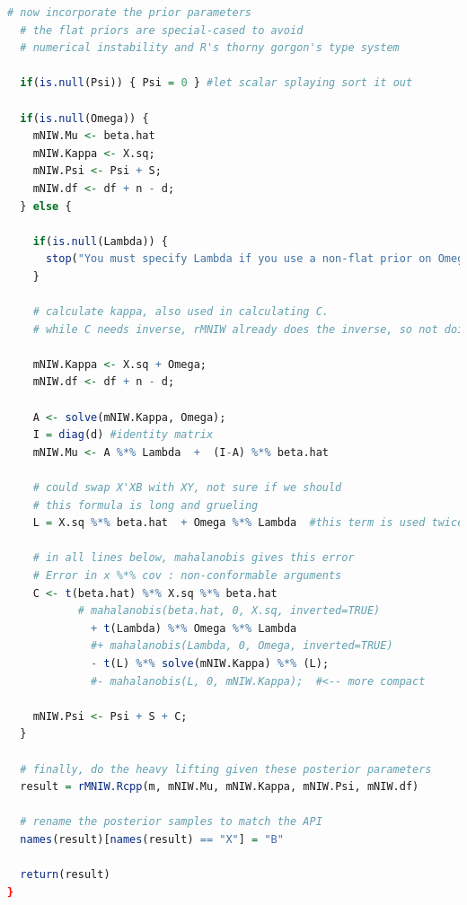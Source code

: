 \documentclass[english]{report}
\begin{document}
\begin{lstlisting}[frame=single, language=R]
  # now incorporate the prior parameters
  # the flat priors are special-cased to avoid
  # numerical instability and R's thorny gorgon's type system
  
  if(is.null(Psi)) { Psi = 0 } #let scalar splaying sort it out
  
  if(is.null(Omega)) {
    mNIW.Mu <- beta.hat
    mNIW.Kappa <- X.sq;
    mNIW.Psi <- Psi + S;
    mNIW.df <- df + n - d;
  } else {
    
    if(is.null(Lambda)) {
      stop("You must specify Lambda if you use a non-flat prior on Omega");
    }
    
    # calculate kappa, also used in calculating C.
    # while C needs inverse, rMNIW already does the inverse, so not doing it here
    
    mNIW.Kappa <- X.sq + Omega;
    mNIW.df <- df + n - d;
    
    A <- solve(mNIW.Kappa, Omega);    
    I = diag(d) #identity matrix
    mNIW.Mu <- A %*% Lambda  +  (I-A) %*% beta.hat
    
    # could swap X'XB with XY, not sure if we should
    # this formula is long and grueling
    L = X.sq %*% beta.hat  + Omega %*% Lambda  #this term is used twice
    
    # in all lines below, mahalanobis gives this error 
    # Error in x %*% cov : non-conformable arguments
    C <- t(beta.hat) %*% X.sq %*% beta.hat
           # mahalanobis(beta.hat, 0, X.sq, inverted=TRUE)
             + t(Lambda) %*% Omega %*% Lambda
             #+ mahalanobis(Lambda, 0, Omega, inverted=TRUE) 
             - t(L) %*% solve(mNIW.Kappa) %*% (L);
             #- mahalanobis(L, 0, mNIW.Kappa);  #<-- more compact
             
    mNIW.Psi <- Psi + S + C;
  }
  
  # finally, do the heavy lifting given these posterior parameters
  result = rMNIW.Rcpp(m, mNIW.Mu, mNIW.Kappa, mNIW.Psi, mNIW.df)
  
  # rename the posterior samples to match the API
  names(result)[names(result) == "X"] = "B" 
  
  return(result)
}

\end{lstlisting}
\end{document}
